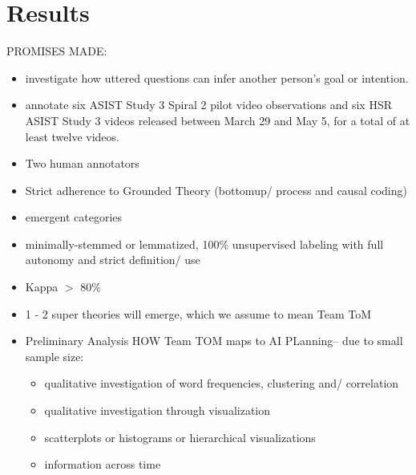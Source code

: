 \documentclass[10pt]{article}
\begin{document}
\newpage







\section{Results}












PROMISES MADE:

\begin{itemize}
    \item investigate how uttered questions can infer another person's goal or intention. 
    \item  annotate six ASIST Study 3 Spiral 2 pilot video observations and
six HSR ASIST Study 3 videos released between March 29 and May 5, for a total
of at least twelve videos. 
    \item Two human annotators
    \item Strict adherence to Grounded Theory (bottomup/ process and causal coding)
    \item emergent categories
    \item minimally-stemmed or lemmatized, 100\% unsupervised labeling with full autonomy and strict definition/ use
    \item Kappa $>$ 80\%
    \item 1 - 2 super theories will emerge, which we assume to mean Team ToM
    \item Preliminary Analysis HOW Team TOM maps to AI PLanning-- due to small sample size:
    \begin{itemize}
        \item qualitative investigation of word frequencies, clustering and/ correlation
        \item qualitative investigation through visualization
        \item scatterplots or histograms or hierarchical visualizations
        \item information across time
    \end{itemize}
 \end{itemize}
 
\end{document}
